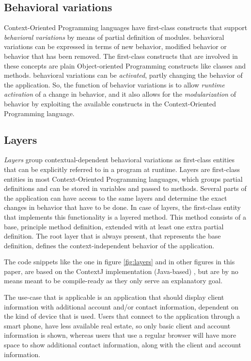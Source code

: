 \documentclass{acm_proc_article-sp}
\begin{document}
\subsection{Behavioral variations}
\label{sec:behavioral_variations}
Context-Oriented Programming languages have first-class constructs that support \textit{behavioral variations} by means of partial definition of modules. behavioral variations can be expressed in terms of new behavior, modified behavior or behavior that has been removed. The first-class constructs that are involved in these concepts are plain Object-oriented Programming constructs like classes and methods. behavioral variations can be \textit{activated}, partly changing the behavior of the application. So, the function of behavior variations is to allow \textit{runtime activation} of a change in behavior, and it also allows for the \textit{modularization} of behavior by exploiting the available constructs in the Context-Oriented Programming language.    

\subsection{Layers}
\label{sec:layers}
\textit{Layers} group contextual-dependent behavioral variations as first-class entities that can be explicitly referred to in a program at runtime. Layers are first-class entities in most Context-Oriented Programming languages, which groups partial definitions and can be stored in variables and passed to methods. Several parts of the application can have access to the same layers and determine the exact changes in behavior that have to be done. In case of layers, the first-class entity that implements this functionality is a layered method. This method consists of a base, principle method definition, extended with at least one extra partial definition. The root layer that is always present, that represents the base definition, defines the context-independent behavior of the application.

The code snippets like the one in figure \ref{fig:layers} and in other figures in this paper, are based on the ContextJ implementation (Java-based) \cite{Appeltauer:2009:IDC:1562112.1562117}, but are by no means meant to be compile-ready as they only serve an explanatory goal. 

The use-case that is applicable is an application that should display client information with additional account and/or contact information, dependent on the kind of device that is used. Users that connect to the application through a smart phone, have less available real estate, so only basic client and account information is shown, whereas users that use a regular browser will have more space to show additional contact information, along with the client and account information. 
\end{document}

